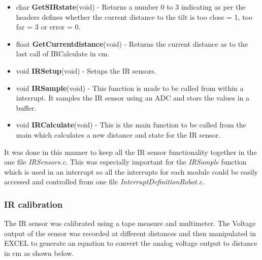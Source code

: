 \documentclass{article}
\begin{document}
\begin{itemize}
	\item char \textbf{Get\textunderscore S\textunderscore IR\textunderscore state}(void) - Returns a number 0 to 3 indicating as per the headers defines whether the current distance to the tilt is too close = 1, too far = 3 or error = 0.
	\item float \textbf{Get\textunderscore Current\textunderscore distance}(void) -  Returns the current distance as to the last call of IR\textunderscore Calculate in cm.  
	\item void \textbf{IR\textunderscore Setup}(void) - Setups the IR sensors. 
	\item void \textbf{IR\textunderscore  Sample}(void) - This function is made to be called from within a interrupt. It samples the IR sensor using an ADC and stors the values in a buffer. 
	\item void \textbf{IR\textunderscore  Calculate}(void) - This is the main function to be called from the main which calculates a new distance and state for the IR sensor. 
\end{itemize}

It was done in this manner to keep all the IR sensor functionality together in the one file \textit{IR\textunderscore Sensors.c}. This was especially important for the \textit{IR\textunderscore Sample} function which is used in an interrupt so all the interrupts for each module could be easily accessed and controlled from one file \textit{Interrupt\textunderscore Definition\textunderscore Robot.c}.



\subsubsection{IR calibration}
The IR sensor was calibrated using a tape measure and multimeter. The Voltage output of the sensor was recorded at different distances and then manipulated in EXCEL to generate an equation to convert the analog voltage output to distance in cm as shown below. 
\end{document}
